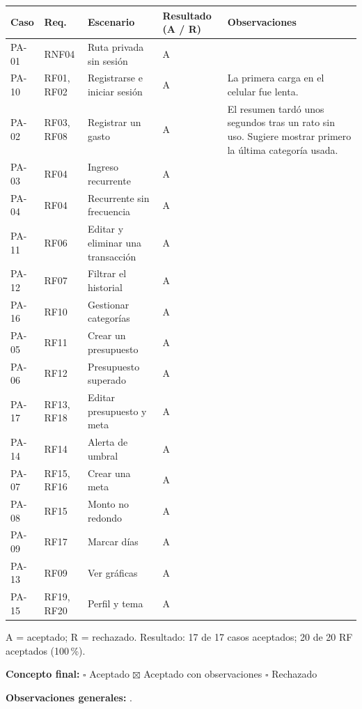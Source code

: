 \vspace{0.4cm}
{\footnotesize
\renewcommand{\arraystretch}{1.5}
\begin{longtable}{|L{1.1cm}|L{1.7cm}|L{4.1cm}|L{1.9cm}|L{4.3cm}|}
\hline
\textbf{Caso} & \textbf{Req.} & \textbf{Escenario} & \textbf{Resultado} (A / R) & \textbf{Observaciones} \\
\hline
\endhead
PA-01 & RNF04 & Ruta privada sin sesión & A & \\ \hline
PA-10 & RF01, RF02 & Registrarse e iniciar sesión & A & La primera carga en el celular fue lenta. \\ \hline
PA-02 & RF03, RF08 & Registrar un gasto & A & El resumen tardó unos segundos tras un rato sin uso. Sugiere mostrar primero la última categoría usada. \\ \hline
PA-03 & RF04 & Ingreso recurrente & A & \\ \hline
PA-04 & RF04 & Recurrente sin frecuencia & A & \\ \hline
PA-11 & RF06 & Editar y eliminar una transacción & A & \\ \hline
PA-12 & RF07 & Filtrar el historial & A & \\ \hline
PA-16 & RF10 & Gestionar categorías & A & \\ \hline
PA-05 & RF11 & Crear un presupuesto & A & \\ \hline
PA-06 & RF12 & Presupuesto superado & A & \\ \hline
PA-17 & RF13, RF18 & Editar presupuesto y meta & A & \\ \hline
PA-14 & RF14 & Alerta de umbral & A & \\ \hline
PA-07 & RF15, RF16 & Crear una meta & A & \\ \hline
PA-08 & RF15 & Monto no redondo & A & \\ \hline
PA-09 & RF17 & Marcar días & A & \\ \hline
PA-13 & RF09 & Ver gráficas & A & \\ \hline
PA-15 & RF19, RF20 & Perfil y tema & A & \\ \hline
\end{longtable}
}

\noindent A = aceptado; R = rechazado. Resultado: 17 de 17 casos aceptados; 20 de 20 RF aceptados (100\,\%).

\vspace{0.3cm}
\noindent\textbf{Concepto final:} \quad $\square$ Aceptado \quad $\boxtimes$ Aceptado con observaciones \quad $\square$ Rechazado

\vspace{0.3cm}
\noindent\textbf{Observaciones generales:} \resObservaciones.

